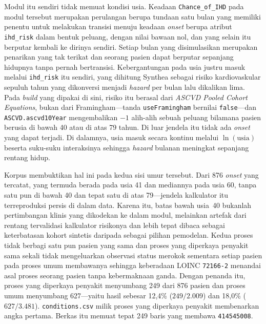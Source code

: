 Modul itu sendiri tidak memuat kondisi usia. Keadaan \texttt{Chance\_of\_IHD} pada modul tersebut merupakan
perulangan berupa tundaan satu bulan yang memiliki penentu untuk melakukan transisi menuju keadaan \emph{onset} berupa atribut \texttt{ihd\_risk} dalam bentuk
peluang, dengan nilai bawaan nol, dan yang selain itu berputar kembali ke dirinya sendiri.
Setiap bulan yang disimulasikan merupakan penarikan yang tak terikat dan seorang pasien dapat berputar
sepanjang hidupnya tanpa pernah bertransisi. Kebergantungan pada usia justru masuk melalui
\texttt{ihd\_risk} itu sendiri, yang dihitung Synthea sebagai risiko kardiovaskular sepuluh
tahun yang dikonversi menjadi \emph{hazard} per bulan lalu dikalikan lima. Pada \emph{build}
yang dipakai di sini, risiko itu berasal dari \emph{ASCVD Pooled Cohort Equations}, bukan dari
Framingham---tanda \texttt{useFramingham} bernilai \texttt{false}---dan
\texttt{ASCVD.ascvd10Year} mengembalikan $-1$ alih-alih sebuah peluang bilamana pasien berusia
di bawah 40 atau di atas 79 tahun. Di luar jendela itu tidak ada \emph{onset} yang dapat terjadi. Di
dalamnya, usia masuk secara kontinu melalui $\ln(\mathrm{usia})$ beserta suku-suku
interaksinya sehingga \emph{hazard} bulanan meningkat sepanjang rentang hidup.

Korpus membuktikan hal ini pada kedua sisi umur tersebut. Dari 876 \emph{onset} yang tercatat, yang
termuda berada pada usia 41 dan mediannya pada usia 60, tanpa satu pun
di bawah 40 dan tepat satu di atas 79---jendela kalkulator itu terreproduksi persis di dalam
data. Karena itu, batas bawah usia~40 bukanlah pertimbangan klinis yang dikodekan ke dalam
modul, melainkan artefak dari rentang tervalidasi kalkulator risikonya dan lebih tepat dibaca
sebagai keterbatasan kohort sintetis daripada sebagai pilihan pemodelan. Kedua proses
tidak berbagi satu pun pasien yang sama dan proses yang diperkaya penyakit sama sekali tidak
mengeluarkan observasi status merokok sementara setiap pasien pada proses umum membawanya
sehingga keberadaan LOINC \texttt{72166-2} menandai asal proses seorang pasien tanpa kebermaknaan
ganda. Dengan penanda itu, proses yang diperkaya penyakit menyumbang 249 dari 876
pasien dan proses umum menyumbang 627---yaitu hasil sebesar 12,4\%
($249/2{.}009$) dan 18,0\% ($627/3{.}481$). \texttt{conditions.csv} milik proses
yang diperkaya penyakit membenarkan angka pertama. Berkas itu memuat tepat
249 baris yang membawa \texttt{414545008}.

